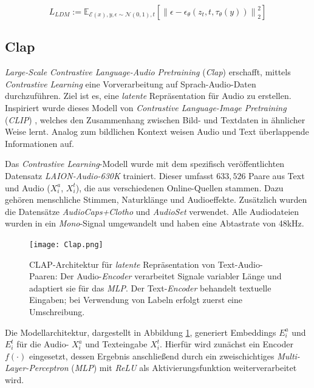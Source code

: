 \documentclass[
  a4paper,  %
  twoside,  %
  bibliography=totoc,
  headsepline,
  cleardoublepage=empty,
  parskip=half,
  draft=false
]{scrbook}
\begin{document}
\begin{equation}
L_{L D M}:=\mathbb{E}_{\mathcal{E}(x), y, \epsilon \sim \mathcal{N}(0,1), t}\left[\left\|\epsilon-\epsilon_\theta\left(z_t, t, \tau_\theta(y)\right)\right\|_2^2\right]
\end{equation}

\subsection{Clap}

\emph{Large-Scale Contrastive Language-Audio Pretraining} (\emph{Clap}) \cite{wu_large-scale_2023} erschafft, mittels \emph{Contrastive Learning} eine Vorverarbeitung auf Sprach-Audio-Daten durchzuführen. Ziel ist es, eine \emph{latente} Repräsentation für Audio zu erstellen. Inspiriert wurde dieses Modell von \emph{Contrastive Language-Image Pretraining} (\emph{CLIP}) \cite{radford_learning_2021}, welches den Zusammenhang zwischen Bild- und Textdaten in ähnlicher Weise lernt. Analog zum bildlichen Kontext weisen Audio und Text überlappende Informationen auf. \cite{wu_large-scale_2023}

Das \emph{Contrastive Learning}-Modell wurde mit dem spezifisch veröffentlichten Datensatz \emph{LAION-Audio-630K} trainiert. Dieser umfasst $633,526$ Paare aus Text und Audio ($X_i^a$, $X_i^t$), die aus verschiedenen Online-Quellen stammen. Dazu gehören menschliche Stimmen, Naturklänge und Audioeffekte. Zusätzlich wurden die Datensätze \emph{AudioCaps+Clotho} \cite{kim_audiocaps_2019} \cite{drossos_clotho_2019} und \emph{AudioSet} \cite{gemmeke_audio_2017} verwendet. Alle Audiodateien wurden in ein \emph{Mono}-Signal umgewandelt und haben eine Abtastrate von 48kHz. \cite{wu_large-scale_2023}

\begin{figure}[h]
  \centering
  \texttt{[image: Clap.png]}
  \caption[Clap Architektur]{CLAP-Architektur für \emph{latente} Repräsentation von Text-Audio-Paaren: Der Audio-\emph{Encoder} verarbeitet Signale variabler Länge und adaptiert sie für das \emph{MLP}. Der Text-\emph{Encoder} behandelt textuelle Eingaben; bei Verwendung von Labeln erfolgt zuerst eine Umschreibung. \cite{wu_large-scale_2023}}
  \label{fig:Clap}
\end{figure} 

Die Modellarchitektur, dargestellt in Abbildung \ref{fig:Clap}, generiert Embeddings $E_i^a$ und $E_i^t$ für die Audio- $X_i^a$ und Texteingabe $X_i^t$. Hierfür wird zunächst ein Encoder $f(\cdot)$ eingesetzt, dessen Ergebnis anschließend durch ein zweischichtiges \emph{Multi-Layer-Perceptron} (\emph{MLP}) mit \emph{ReLU} \cite{agarap_deep_2019} als Aktivierungsfunktion weiterverarbeitet wird. \cite{wu_large-scale_2023}
\end{document}
